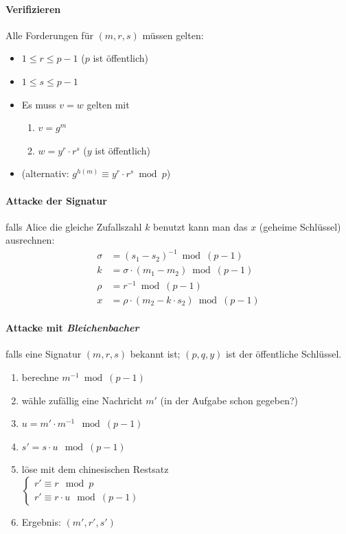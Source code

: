 \documentclass[8pt,a4paper,landscape]{article}
\begin{document}
\begin{multicols}{4}
\paragraph{Verifizieren} Alle Forderungen für $(m, r, s)$ müssen gelten:
\begin{itemize}[itemsep=1pt] 
    \item $1 \leq r \leq p-1$  ($p$ ist öffentlich)
    \item $1 \leq s \leq p-1$ 
    \item Es muss $v=w$ gelten mit \begin{enumerate}[itemsep=1pt] 
    \item $v = g^m$
    \item $w = y^{r} \cdot r^{s}$ ($y$ ist öffentlich)
    \end{enumerate}
    \item (alternativ: $g^{h(m)} \equiv y^{r} \cdot r^{s} \bmod p$)
\end{itemize}

\paragraph{Attacke der Signatur} falls Alice die gleiche Zufallszahl $k$ benutzt 
kann man das $x$ (geheime Schlüssel) ausrechnen:
\begin{align*}
\sigma &= (s_{1} - s_{2})^{-1} \bmod (p-1)\\
 k      &= \sigma \cdot (m_{1} - m_{2}) \bmod (p-1)\\
 \rho   &= r^{-1} \bmod (p-1)\\
 x      &= \rho \cdot (m_{2} - k \cdot s_{2}) \bmod (p-1)
\end{align*}

\paragraph{Attacke mit \emph{Bleichenbacher}} falls eine Signatur $(m,r,s)$
bekannt ist; $(p,q,y)$ ist der öffentliche Schlüssel.
\begin{enumerate}
\item berechne $m^{-1} \bmod (p-1)$
\item wähle zufällig eine Nachricht $m'$ (in der Aufgabe schon gegeben?)
\item $u  = m' \cdot m^{-1} \mod (p-1)$
\item $s' = s \cdot u \mod (p-1)$
\item löse mit dem chinesischen Restsatz \\[0.3cm]
      $
		\begin{cases}
            r' \equiv r \mod p \\
            r' \equiv r \cdot u \mod (p-1)
        \end{cases}      
      $
\item Ergebnis: $(m', r', s')$
\end{enumerate}


\end{multicols}
\end{document}
